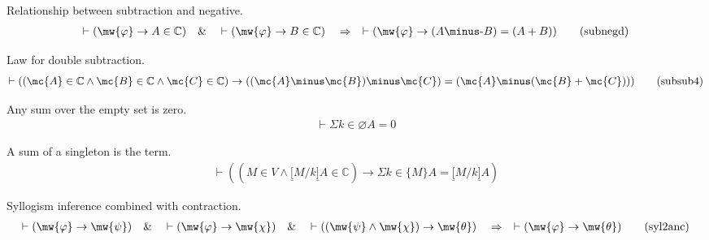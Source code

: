 \begin{lemma} {Relationship between subtraction and
negative.}
\begin{align}
\vdash ( \mw{\varphi} \rightarrow A \in \mathbb{C} )\quad\&\quad \vdash (
    \mw{\varphi} \rightarrow B \in \mathbb{C} )\quad\Rightarrow\quad \vdash (
    \mw{\varphi} \rightarrow ( A \minus \textrm{-} B ) = ( A + B )
    )\label{eq:subnegd}\tag{subnegd}
\end{align}
\end{lemma}


\begin{lemma} {Law for double subtraction.} 
\begin{align}
\vdash ( ( \mc{A} \in \mathbb{C} \wedge \mc{B} \in \mathbb{C} \wedge \mc{C} \in
    \mathbb{C} ) \rightarrow ( ( \mc{A} \minus \mc{B} ) \minus \mc{C} ) = ( \mc{A} \minus (
    \mc{B} + \mc{C} ) ) )\label{eq:subsub4}\tag{subsub4}
\end{align}
\end{lemma}


\begin{lemma} {Any sum over the empty set is zero.} 
\begin{align}
\vdash \Sigma k \in \varnothing A = 0\label{eq:sum0}\tag{sum0}
\end{align}
\end{lemma}


\begin{lemma} {A sum of a singleton is the term.}
\begin{align}
\vdash ( ( M \in V \wedge \underline{[} M / k \underline{]} A \in \mathbb{C} )
    \rightarrow \Sigma k \in \{ M \} A = \underline{[} M / k \underline{]} A
    )\label{eq:sumsns}\tag{sumsns}
\end{align}
\end{lemma}


\begin{lemma} {Syllogism inference combined with
contraction.}  
\begin{align}
\vdash ( \mw{\varphi} \rightarrow \mw{\psi} )\quad\&\quad \vdash ( \mw{\varphi}
    \rightarrow \mw{\chi} )\quad\&\quad \vdash ( ( \mw{\psi} \wedge \mw{\chi} )
    \rightarrow \mw{\theta} )\quad\Rightarrow\quad \vdash ( \mw{\varphi}
    \rightarrow \mw{\theta} )\label{eq:syl2anc}\tag{syl2anc}
\end{align}
\end{lemma}


